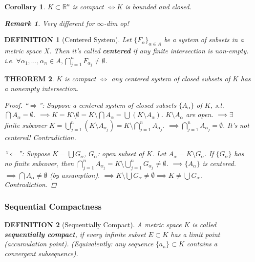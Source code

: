 \documentclass[12pt]{article}
\theoremstyle{blueplain}
\newtheorem{theorem}{THEOREM}[section]
\newtheorem{corollary}[theorem]{Corollary}
\theoremstyle{bluedef}
\newtheorem{definition}{DEFINITION}[section]
\theoremstyle{blueremark}
\newtheorem{remark}{Remark}[section]
\newcommand{\R}{\mathbb{R}}
\numberwithin{equation}{section}
\begin{document}
      \begin{corollary}
        $K \subset \R^n$ is compact $\iff K$ is bounded and closed.
        \begin{remark}
          Very different for $\infty$-dim op!
        \end{remark}
      \end{corollary}

      \begin{definition}[Centered System]
        Let $\{F_\alpha\}_{\alpha \in A}$ be a system of subsets in a metric space $X$. Then it's called \textbf{centered} if any finite intersection is non-empty.
        i.e. $\forall \alpha_1, \ldots, \alpha_n \in A, \bigcap_{j=1}^n F_{\alpha_j} \neq \emptyset$.
      \end{definition}

      \begin{theorem}
        $K$ is compact $\iff$ any centered system of closed subsets of $K$ has a nonempty intersection.
        \begin{proof}
          ``$\Rightarrow$'': Suppose a centered system of closed subsets $\{A_\alpha\}$ of $K$, s.t. $\bigcap A_\alpha = \emptyset$.
          $\implies K = K \setminus \emptyset = K \setminus \bigcap A_\alpha = \bigcup (K \setminus A_\alpha)$.
          $K \setminus A_\alpha$ are open.
          $\implies \exists$ finite subcover $K = \bigcup_{j=1}^n (K \setminus A_{\alpha_j}) = K \setminus \bigcap_{j=1}^n A_{\alpha_j}$.
          $\implies \bigcap_{j=1}^n A_{\alpha_j} = \emptyset$. It's not centered! Contradiction.

          ``$\Leftarrow$'': Suppose $K = \bigcup G_\alpha$, $G_\alpha$: open subset of $K$.
          Let $A_\alpha = K \setminus G_\alpha$.
          If $\{G_\alpha\}$ has no finite subcover, then $\bigcap_{j=1}^n A_{\alpha_j} = K \setminus \bigcup_{j=1}^n G_{\alpha_j} \neq \emptyset$.
          $\implies \{A_\alpha\}$ is centered.
          $\implies \bigcap A_\alpha \neq \emptyset$ (by assumption).
          $\implies K \setminus \bigcup G_\alpha \neq \emptyset \implies K \neq \bigcup G_\alpha$. Contradiction.
        \end{proof}
      \end{theorem}

      \subsubsection{Sequential Compactness}

      \begin{definition}[Sequentially Compact]
        A metric space $K$ is called \textbf{sequentially compact}, if every infinite subset $E \subset K$ has a limit point (accumulation point).
        (Equivalently: any sequence $\{a_n\} \subset K$ contains a convergent subsequence).
      \end{definition}
\end{document}
